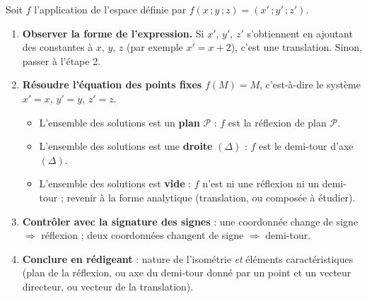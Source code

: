 \documentclass[11pt]{article}
\newcommand{\cle}[1]{{\popxbold\color{popdark}#1}}
\begin{document}
\begin{methode}
Soit $f$ l'application de l'espace définie par $f(x\,;y\,;z) = (x'\,;y'\,;z')$.
\begin{enumerate}
\item \textbf{Observer la forme de l'expression.} Si $x'$, $y'$, $z'$ s'obtiennent en ajoutant des constantes à $x$, $y$, $z$ (par exemple $x' = x + 2$), c'est une \cle{translation}. Sinon, passer à l'étape 2.
\item \textbf{Résoudre l'équation des points fixes} $f(M) = M$, c'est-à-dire le système $x' = x$, $y' = y$, $z' = z$.
\begin{itemize}
\item L'ensemble des solutions est un \textbf{plan} $\mathcal{P}$ : $f$ est la \cle{réflexion} de plan $\mathcal{P}$.
\item L'ensemble des solutions est une \textbf{droite} $(\Delta)$ : $f$ est le \cle{demi-tour} d'axe $(\Delta)$.
\item L'ensemble des solutions est \textbf{vide} : $f$ n'est ni une réflexion ni un demi-tour ; revenir à la forme analytique (translation, ou composée à étudier).
\end{itemize}
\item \textbf{Contrôler avec la signature des signes} : une coordonnée change de signe $\Rightarrow$ réflexion ; deux coordonnées changent de signe $\Rightarrow$ demi-tour.
\item \textbf{Conclure en rédigeant} : nature de l'isométrie \emph{et} éléments caractéristiques (plan de la réflexion, ou axe du demi-tour donné par un point et un vecteur directeur, ou vecteur de la translation).
\end{enumerate}
\end{methode}
\end{document}
